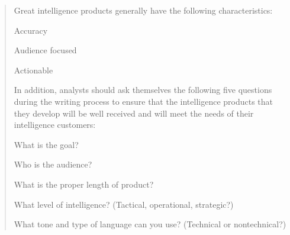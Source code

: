 \documentclass[Screen16to9,17pt]{foils}
\begin{document}

\begin{quote}
Great intelligence products generally have the following characteristics:
\begin{list2}
\item Accuracy
\item Audience focused
\item Actionable
\end{list2}

In addition, analysts should ask themselves the following five questions during the
writing process to ensure that the intelligence products that they develop will be well
received and will meet the needs of their intelligence customers:

\begin{list2}
\item What is the goal?
\item Who is the audience?
\item What is the proper length of product?
\item What level of intelligence? (Tactical, operational, strategic?)
\item What tone and type of language can you use? (Technical or nontechnical?)
\end{list2}
\end{quote}


\end{document}
